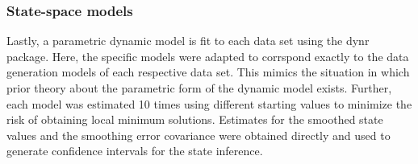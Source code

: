 \subsubsection{State-space models}

Lastly, a parametric dynamic model is fit to each data set using the dynr package.
Here, the specific models were adapted to corrspond exactly to the data 
generation models of each respective data set. This mimics the situation in which 
prior theory about the parametric form of the dynamic model exists. Further, each 
model was estimated 10 times using different starting values to minimize the 
risk of obtaining local minimum solutions. Estimates for the smoothed state 
values and the smoothing error covariance were obtained directly and used to 
generate confidence intervals for the state inference.